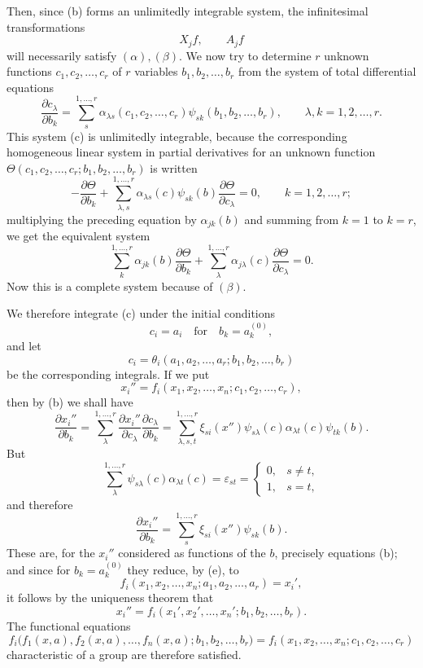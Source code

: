 \documentclass[11pt]{book}
\begin{document}
Then, since (b) forms an unlimitedly integrable system, the infinitesimal transformations
\[
 X_jf,\qquad A_jf
\]
will necessarily satisfy $(\alpha),(\beta)$. We now try to determine $r$ unknown functions $c_1,c_2,\ldots,c_r$ of $r$ variables $b_1,b_2,\ldots,b_r$ from the system of total differential equations
\begin{equation*}\tag{c}
 \frac{\partial c_\lambda}{\partial b_k}=\sum\limits_s^{1,\ldots,r}\alpha_{\lambda s}(c_1,c_2,\ldots,c_r)\psi_{sk}(b_1,b_2,\ldots,b_r),
 \qquad \lambda,k=1,2,\ldots,r.
\end{equation*}
This system (c) is unlimitedly integrable, because the corresponding homogeneous linear system in partial derivatives for an unknown function $\Theta(c_1,c_2,\ldots,c_r;b_1,b_2,\ldots,b_r)$ is written
\[
 -\frac{\partial\Theta}{\partial b_k}+\sum\limits_{\lambda,s}^{1,\ldots,r}\alpha_{\lambda s}(c)\psi_{sk}(b)\frac{\partial\Theta}{\partial c_\lambda}=0,
 \qquad k=1,2,\ldots,r;
\]
multiplying the preceding equation by $\alpha_{jk}(b)$ and summing from $k=1$ to $k=r$, we get the equivalent system
\[
 \sum\limits_k^{1,\ldots,r}\alpha_{jk}(b)\frac{\partial\Theta}{\partial b_k}+\sum\limits_\lambda^{1,\ldots,r}\alpha_{j\lambda}(c)\frac{\partial\Theta}{\partial c_\lambda}=0.
\]
Now this is a complete system because of $(\beta)$.

We therefore integrate (c) under the initial conditions
\[
 c_i=a_i\quad\text{for}\quad b_k=a_k^{(0)},
\]
and let
\begin{equation*}\tag{d}
 c_i=\theta_i(a_1,a_2,\ldots,a_r; b_1,b_2,\ldots,b_r)
\end{equation*}
be the corresponding integrals. If we put
\begin{equation*}\tag{e}
 x_i''=f_i(x_1,x_2,\ldots,x_n;c_1,c_2,\ldots,c_r),
\end{equation*}
then by (b) we shall have
\[
 \frac{\partial x_i''}{\partial b_k}
 =\sum\limits_\lambda^{1,\ldots,r} \frac{\partial x_i''}{\partial c_\lambda}\frac{\partial c_\lambda}{\partial b_k}
 =\sum\limits_{\lambda,s,t}^{1,\ldots,r}\xi_{si}(x'')\psi_{s\lambda}(c)\alpha_{\lambda t}(c)\psi_{tk}(b).
\]
But
\[
 \sum\limits_\lambda^{1,\ldots,r}\psi_{s\lambda}(c)\alpha_{\lambda t}(c)=\varepsilon_{st}=\begin{cases}0,&s\ne t,\\1,&s=t,\end{cases}
\]
and therefore
\[
 \frac{\partial x_i''}{\partial b_k}=\sum\limits_s^{1,\ldots,r}\xi_{si}(x'')\psi_{sk}(b).
\]
These are, for the $x_i''$ considered as functions of the $b$, precisely equations (b); and since for $b_k=a_k^{(0)}$ they reduce, by (e), to
\[
 f_i(x_1,x_2,\ldots,x_n; a_1,a_2,\ldots,a_r)=x_i',
\]
it follows by the uniqueness theorem that
\[
 x_i''=f_i(x_1',x_2',\ldots,x_n'; b_1,b_2,\ldots,b_r).
\]
The functional equations
\[
 f_i\bigl(f_1(x,a),f_2(x,a),\ldots,f_n(x,a); b_1,b_2,\ldots,b_r\bigr)
 =f_i(x_1,x_2,\ldots,x_n; c_1,c_2,\ldots,c_r)
\]
characteristic of a group are therefore satisfied.
\end{document}
